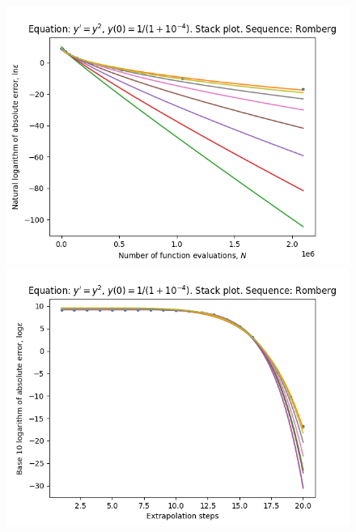 \begin{figure}[H]
\centering
\begin{minipage}{0.45\textwidth}
\centering
\includegraphics[scale=0.45]{../results/emr_plots/singularity_4_hp_romberg_stack.png}
\end{minipage}
\begin{minipage}{0.45\textwidth}
\centering
\includegraphics[scale=0.45]{../results/emr_plots/singularity_4_hp_romberg_steps_stack.png}
\end{minipage}
\end{figure}

